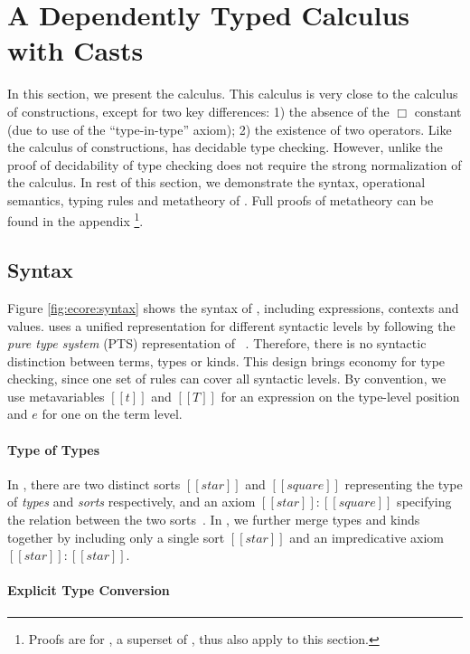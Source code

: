 
\section{A Dependently Typed Calculus with Casts}\label{sec:ecore}

In this section, we present the \ecore calculus. This calculus is very
close to the calculus of constructions, except for two key differences:
1) the absence of the $\Box$ constant (due to use of the
``type-in-type'' axiom); 2) the existence of two \cast operators. Like
the calculus of constructions, \ecore has decidable
type checking. However, unlike \cc the proof of decidability of
type checking does not require the strong normalization of the
calculus.  In rest of this section, we demonstrate the syntax,
operational semantics, typing rules and metatheory of \ecore.
Full proofs of metatheory can be found in the appendix%
\footnote{Proofs are for \name, a superset of \ecore, thus also apply to this section.}.

\subsection{Syntax}\label{sec:ecore:syn}

Figure \ref{fig:ecore:syntax} shows the syntax of \ecore, including
expressions, contexts and values. \ecore uses a unified 
representation for different syntactic levels by following the
\emph{pure type system} (PTS) representation of \cc~\cite{handbook}. Therefore, there
is no syntactic distinction between terms, types or kinds. This design
brings economy for type checking, since one set of rules can cover
all syntactic levels. By convention, we use metavariables $[[t]]$ and
$[[T]]$ for an expression on the type-level position and $e$ for one
on the term level.

\paragraph{Type of Types}
In \cc, there are two distinct sorts $[[star]]$ and
$[[square]]$ representing the type of \emph{types} and \emph{sorts}
respectively, and an axiom $[[star]]:[[square]]$ specifying the
relation between the two sorts~\cite{handbook}. In \ecore, we further merge types and
kinds together by including only a single sort $[[star]]$ and an
impredicative axiom $[[star]]:[[star]]$.

\paragraph{Explicit Type Conversion}

